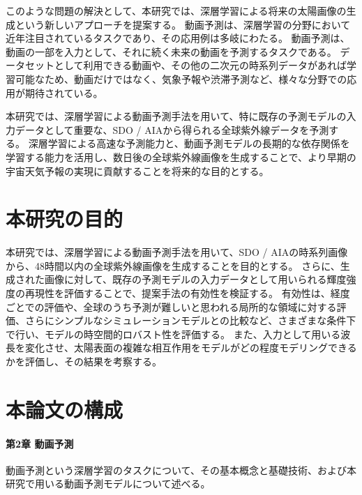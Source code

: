 このような問題の解決として、本研究では、深層学習による将来の太陽画像の生成という新しいアプローチを提案する。
動画予測は、深層学習の分野において近年注目されているタスクであり、その応用例は多岐にわたる。
動画予測は、動画の一部を入力として、それに続く未来の動画を予測するタスクである。
データセットとして利用できる動画や、その他の二次元の時系列データがあれば学習可能なため、動画だけではなく、気象予報や渋滞予測など、様々な分野での応用が期待されている。

本研究では、深層学習による動画予測手法を用いて、特に既存の予測モデルの入力データとして重要な、SDO / AIAから得られる全球紫外線データを予測する。
深層学習による高速な予測能力と、動画予測モデルの長期的な依存関係を学習する能力を活用し、数日後の全球紫外線画像を生成することで、より早期の宇宙天気予報の実現に貢献することを将来的な目的とする。


\section{本研究の目的}
  本研究では、深層学習による動画予測手法を用いて、SDO / AIAの時系列画像から、48時間以内の全球紫外線画像を生成することを目的とする。
  さらに、生成された画像に対して、既存の予測モデルの入力データとして用いられる輝度強度の再現性を評価することで、提案手法の有効性を検証する。
  有効性は、経度ごとでの評価や、全球のうち予測が難しいと思われる局所的な領域に対する評価、さらにシンプルなシミュレーションモデルとの比較など、さまざまな条件下で行い、モデルの時空間的ロバスト性を評価する。
  また、入力として用いる波長を変化させ、太陽表面の複雑な相互作用をモデルがどの程度モデリングできるかを評価し、その結果を考察する。


\section{本論文の構成}
  \paragraph{第2章 動画予測}
    動画予測という深層学習のタスクについて、その基本概念と基礎技術、および本研究で用いる動画予測モデルについて述べる。

